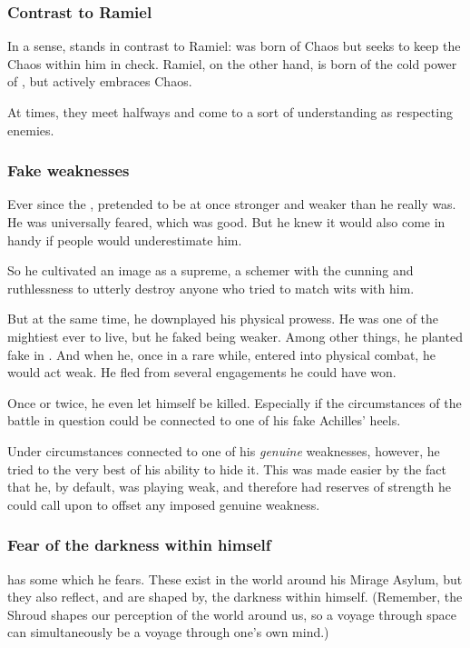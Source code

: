 \subsubsection{Contrast to Ramiel}
In a sense, \Ishna{} stands in contrast to Ramiel: 
\Ishna{} was born of Chaos but seeks to keep the Chaos within him in check. 
Ramiel, on the other hand, is born of the cold power of \Erebos, but actively embraces Chaos.

At times, they meet halfways and come to a sort of understanding as respecting enemies.





\subsubsection{Fake weaknesses}
Ever since the \secondbanewar, \Ishnaruchaefir{} pretended to be at once stronger and weaker than he really was. 
He was universally feared, which was good. 
But he knew it would also come in handy if people would underestimate him. 

So he cultivated an image as a  supreme, a schemer with the cunning and ruthlessness to utterly destroy anyone who tried to match wits with him. 

But at the same time, he downplayed his physical prowess. 
He was one of the mightiest \dragons{} ever to live, but he faked being weaker. 
Among other things, he planted fake  in \emph{}. 
And when he, once in a rare while, entered into physical combat, he would act weak. 
He fled from several engagements he could have won. 

Once or twice, he even let himself be killed. 
Especially if the circumstances of the battle in question could be connected to one of his fake Achilles' heels. 

Under circumstances connected to one of his \emph{genuine} weaknesses, however, he tried to the very best of his ability to hide it.
This was made easier by the fact that he, by default, was playing weak, and therefore had reserves of strength he could call upon to offset any imposed genuine weakness. 





\subsubsection{Fear of the darkness within himself}
\Ishnaruchaefir{} has some  which he fears. 
These exist in the world around his Mirage Asylum, but they also reflect, and are shaped by, the darkness within himself. 
(Remember, the Shroud shapes our perception of the world around us, so a voyage through space can simultaneously be a voyage through one's own mind.) 

